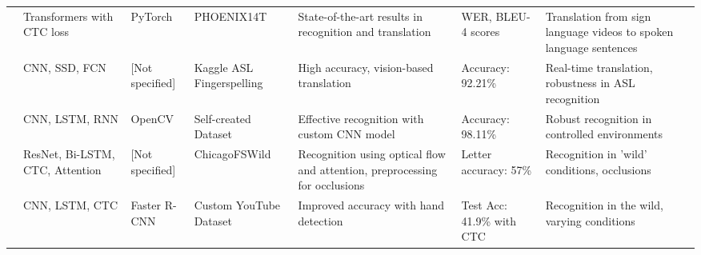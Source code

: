 \begin{longtable}{p{}p{}p{}p{}p{}p{}p{}}
    \cite{cihancamgozSignLanguageTransformers2020}     & Transformers with CTC loss                                                                                            & PyTorch                  & PHOENIX14T                     & State-of-the-art results in recognition and translation                                         & WER, BLEU-4 scores                                     & Translation from sign language videos to spoken language sentences       \\

    \cite{abiyevReconstructionConvolutionalNeural2020} & CNN, SSD, FCN                                                                                                         & [Not specified]          & Kaggle ASL Fingerspelling      & High accuracy, vision-based translation                                                         & Accuracy: 92.21\%                                      & Real-time translation, robustness in ASL recognition                     \\

    \cite{bantupalliAmericanSignLanguage2018}          & CNN, LSTM, RNN                                                                                                        & OpenCV                   & Self-created Dataset           & Effective recognition with custom CNN model                                                     & Accuracy: 98.11\%                                      & Robust recognition in controlled environments                            \\

    \cite{kabadeAmericanSignLanguage2023}              & ResNet, Bi-LSTM, CTC, Attention                                                                                       & [Not specified]          & ChicagoFSWild                  & Recognition using optical flow and attention, preprocessing for occlusions                      & Letter accuracy: 57\%                                  & Recognition in 'wild' conditions, occlusions                             \\

    \cite{shiAmericanSignLanguage2018}                 & CNN, LSTM, CTC                                                                                                        & Faster R-CNN             & Custom YouTube Dataset         & Improved accuracy with hand detection                                                           & Test Acc: 41.9\% with CTC                              & Recognition in the wild, varying conditions                              \\


\end{longtable}
